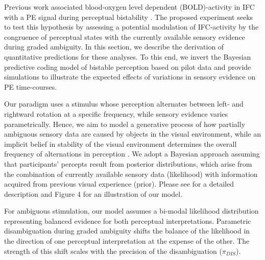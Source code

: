\documentclass[12pt]{article}
\begin{document}
Previous work associated blood-oxygen level dependent (BOLD)-activity in IFC with a PE signal during perceptual bistability \parencite{Weilnhammer2017}. The proposed experiment seeks to test this hypothesis by assessing a potential modulation of IFC-activity by the congruence of perceptual states with the currently available sensory evidence during graded ambiguity. In this section, we describe the derivation of quantitative predictions for these analyses. To this end, we invert the Bayesian predictive coding model of bistable perception \parencite{Weilnhammer2017} based on pilot data and provide simulations to illustrate the expected effects of variations in sensory evidence on PE time-courses. 

Our paradigm uses a stimulus whose perception alternates between left- and rightward rotation at a specific frequency, while sensory evidence varies parametrically. Hence, we aim to model a generative process of how partially ambiguous sensory data are caused by objects in the visual environment, while an implicit belief in stability of the visual environment determines the overall frequency of alternations in perception \parencite{Weilnhammer2017}. We adopt a Bayesian approach assuming that participants' percepts result from posterior distributions, which arise from the combination of currently available sensory data (likelihood) with information acquired from previous visual experience (prior). Please see \parencite{Weilnhammer2017} for a detailed description and Figure 4 for an illustration of our model. 

For ambiguous stimulation, our model assumes a bi-modal likelihood distribution representing balanced evidence for both perceptual interpretations. Parametric disambiguation during graded ambiguity shifts the balance of the likelihood in the direction of one perceptual interpretation at the expense of the other. The strength of this shift scales with the precision of the disambiguation ($\pi_{DIS}$). 
\end{document}
